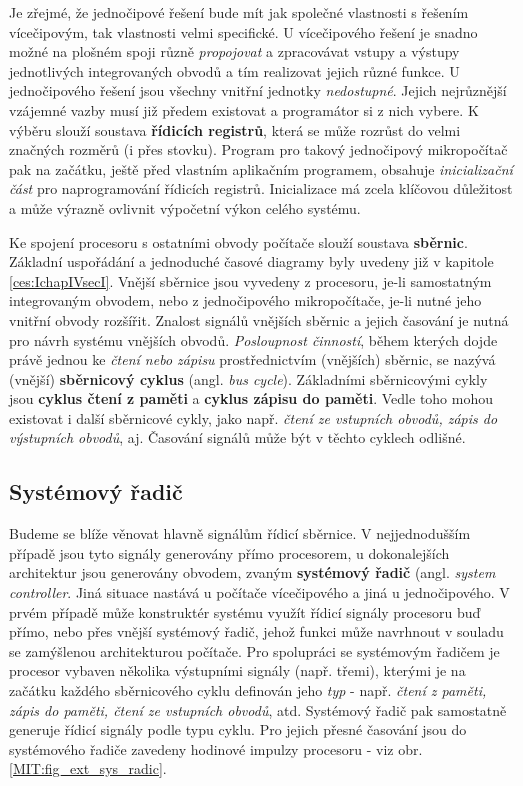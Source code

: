     Je zřejmé, že jednočipové řešení bude mít jak společné vlastnosti s řešením vícečipovým, tak 
    vlastnosti velmi specifické. U vícečipového řešení je snadno možné na plošném spoji různě 
    \emph{propojovat} a zpracovávat vstupy a výstupy jednotlivých integrovaných obvodů a tím 
    realizovat jejich různé funkce. U jednočipového řešení jsou všechny vnitřní jednotky 
    \emph{nedostupné}. Jejich nejrůznější vzájemné vazby musí již předem existovat a programátor si 
    z nich vybere. K výběru slouží soustava \textbf{řídicích registrů}, která se může rozrůst do 
    velmi značných rozměrů (i přes stovku). Program pro takový jednočipový mikropočítač pak na 
    začátku, ještě před vlastním aplikačním programem, obsahuje \emph{inicializační část} pro 
    naprogramování řídicích registrů. Inicializace má zcela klíčovou důležitost a může výrazně 
    ovlivnit výpočetní výkon celého systému.
    
    Ke spojení procesoru s ostatními obvody počítače slouží soustava \textbf{sběrnic}. Základní 
    uspořádání a jednoduché časové diagramy byly uvedeny již v kapitole \ref{ces:IchapIVsecI}. 
    Vnější sběrnice jsou vyvedeny z procesoru, je-li samostatným integrovaným obvodem, nebo z 
    jednočipového mikropočítače, je-li nutné jeho vnitřní obvody rozšířit. Znalost signálů vnějších 
    sběrnic a jejich časování je nutná pro návrh systému vnějších obvodů. \emph{Posloupnost 
    činností}, během kterých dojde právě jednou ke \emph{čtení nebo zápisu} prostřednictvím 
    (vnějších) sběrnic, se nazývá (vnější) \textbf{sběrnicový cyklus} (angl. \emph{bus cycle}). 
    Základními sběrnicovými cykly jsou \textbf{cyklus čtení z paměti} a \textbf{cyklus 
    zápisu do paměti}. Vedle toho mohou existovat i další sběrnicové cykly, jako např. \emph{čtení 
    ze vstupních obvodů, zápis do výstupních obvodů}, aj. Časování signálů může být v těchto 
    cyklech odlišné.
    
    \subsection{Systémový řadič}
      Budeme se blíže věnovat hlavně signálům řídicí sběrnice. V nejjednodušším případě jsou tyto 
      signály generovány přímo procesorem, u dokonalejších architektur jsou generovány obvodem, 
      zvaným \textbf{systémový řadič} (angl. \emph{system controller}. Jiná situace nastává u 
      počítače vícečipového a jiná u jednočipového. V prvém případě může konstruktér systému využít 
      řídicí signály procesoru buď přímo, nebo přes vnější systémový řadič, jehož funkci může 
      navrhnout v souladu se zamýšlenou architekturou počítače. Pro spolupráci se systémovým 
      řadičem je procesor vybaven několika výstupními signály (např. třemi), kterými je na začátku 
      každého sběrnicového cyklu definován jeho \emph{typ} - např. \emph{čtení z paměti, zápis do 
      paměti, čtení ze vstupních obvodů}, atd. Systémový řadič pak samostatně generuje řídicí 
      signály podle typu cyklu. Pro jejich přesné časování jsou do systémového řadiče zavedeny 
      hodinové impulzy procesoru - viz obr. \ref{MIT:fig_ext_sys_radic}.
    
